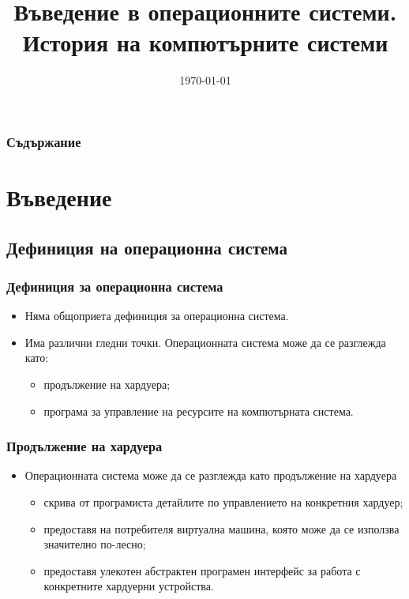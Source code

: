 \documentclass[ignorenonframetext, hyperref=unicode]{beamer}
\title[Въведение в ОС. История на КС]{Въведение в операционните системи. История
на компютърните системи}
\date{\today}
\begin{document}
\frame{\maketitle}

\begin{frame}
\frametitle{Съдържание}
\tableofcontents[hidesubsections]
\end{frame}

\section{Въведение}

\subsection{Дефиниция на операционна система}

\begin{frame}\frametitle{Дефиниция за операционна система}
\begin{itemize}
\item Няма общоприета дефиниция за операционна система.
\item Има различни гледни точки. Операционната система може да се разглежда като:
\begin{itemize}
\item продължение на хардуера;
\item програма за управление на ресурсите на компютърната система.

\end{itemize}
\end{itemize}
\end{frame}

\begin{frame}\frametitle{Продължение на хардуера}
\begin{itemize}
\item Операционната система може да се разглежда като продължение на хардуера

\begin{itemize}
\item скрива от програмиста детайлите по управлението на конкретния хардуер;
\item предоставя на потребителя виртуална машина, която може да се използва
значително по-лесно;
\item предоставя улекотен абстрактен програмен интерфейс за работа с конкретните
хардуерни устройства.
\end{itemize}


\end{itemize}
\end{frame}
\end{document}
